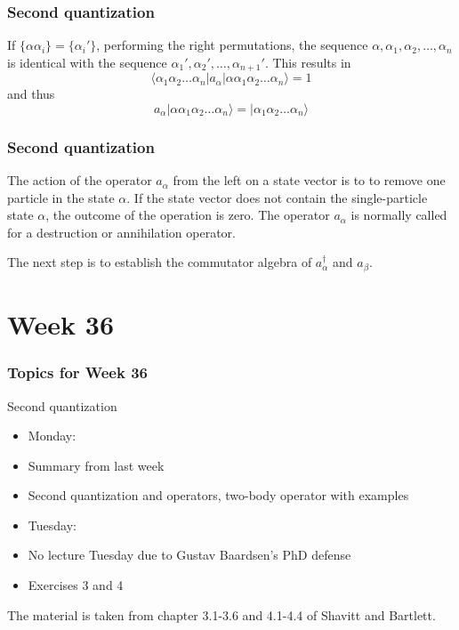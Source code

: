 \documentclass[compress]{beamer}
\newcommand*{\ket}[1]{|#1\rangle}
\newcommand*{\bra}[1]{\langle#1|}
\newcommand{\element}[3]
        {\bra{#1}#2\ket{#3}}
\begin{document}
\frame
{
  \frametitle{Second quantization}
\begin{small}
{\scriptsize
If $\{\alpha\alpha_i\} = \{\alpha_i'\}$, performing the right permutations, the sequence
$\alpha ,\alpha_1, \alpha_2, \dots, \alpha_n$ is identical with the sequence
$\alpha_1', \alpha_2', \dots, \alpha_{n+1}'$. This results in
\begin{equation}
	\element{\alpha_1\alpha_2 \dots \alpha_n}{a_\alpha}{\alpha\alpha_1\alpha_2 \dots \alpha_{n}} = 1 \label{eq:2-14}
\end{equation}
and thus
\begin{equation}
	a_\alpha \ket{\alpha\alpha_1\alpha_2 \dots \alpha_{n}} = \ket{\alpha_1\alpha_2 \dots \alpha_{n}} \label{eq:2-15}
\end{equation}
}
\end{small}
}

\frame
{
  \frametitle{Second quantization}
\begin{small}
{\scriptsize
The action of the operator 
$a_\alpha$ from the left on a state vector  is to to remove  one particle in the state
$\alpha$. 
If the state vector does not contain the single-particle state $\alpha$, the outcome of the operation is zero.
The operator  $a_\alpha$ is normally called for a destruction or annihilation operator.

The next step is to establish the  commutator algebra of $a_\alpha^\dagger$ and
$a_\beta$. 
}
\end{small}
}


\section[Week 36]{Week 36}
\frame
{
  \frametitle{Topics for Week 36}
  \begin{block}{Second quantization}
\begin{itemize}
\item Monday:
\item Summary from last week
\item Second quantization and operators, two-body operator with examples 
\item Tuesday:
\item No lecture Tuesday due to Gustav Baardsen's PhD defense
\item Exercises 3 and 4
\end{itemize}
The material is taken from chapter 3.1-3.6 and 4.1-4.4 of Shavitt and Bartlett. 
  \end{block}
} 
\end{document}
